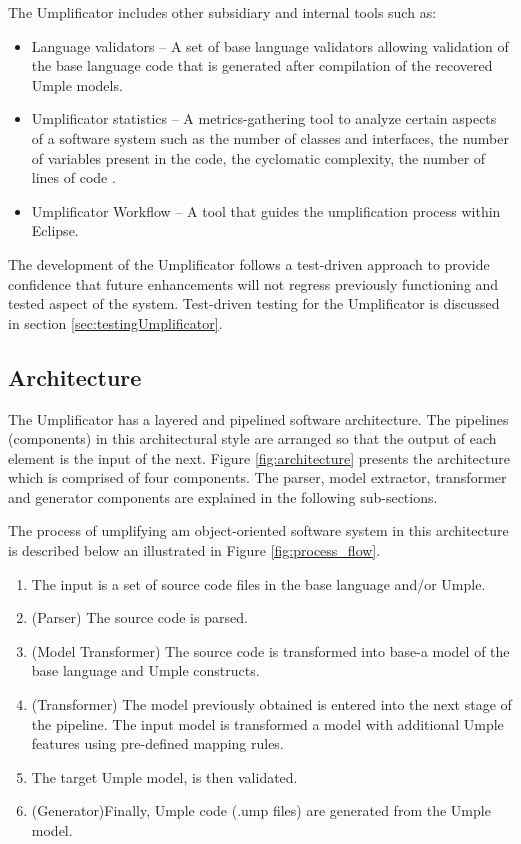 The Umplificator includes other subsidiary and internal tools such as:
\begin{itemize}
\item Language validators – A set of base language validators allowing validation of the base language code that is generated after compilation of the recovered Umple models.
\item Umplificator statistics –  A metrics-gathering tool to analyze certain aspects of a software system such as the number of classes and interfaces, the  number of variables present in the code, the cyclomatic complexity, the number of lines of code \cite{MetricsBuse}.  
\item Umplificator Workflow – A tool that guides the umplification process within Eclipse.
\end{itemize}

The development of the Umplificator follows a test-driven approach to provide confidence that future enhancements will not regress previously functioning and tested aspect of the system. Test-driven testing for the Umplificator is discussed in section \ref{sec:testingUmplificator}. 

\subsection{Architecture}
\label{sec:architecture}

The Umplificator has a layered and pipelined software architecture. The pipelines (components) in this architectural style are arranged so that the output of each element is the input of the next.  Figure \ref{fig:architecture} presents the architecture which is comprised  of four components. The parser, model extractor, transformer and generator components are explained in the following sub-sections.

The process of umplifying am object-oriented software system in this architecture is described below an illustrated in Figure \ref{fig:process_flow}.

\begin{enumerate}
\item  The input is a set of source code files in the base language and/or Umple.
\item (Parser) The source code is parsed. 
\item (Model Transformer) The source code is transformed into base-a model of the base language and Umple constructs.
\item (Transformer) The model previously obtained is entered into the next stage of the pipeline. The input model is transformed a model with additional Umple features using pre-defined mapping rules. 
\item The target Umple model, is then validated. 
\item (Generator)Finally, Umple code (.ump files) are generated from the Umple model.
\end{enumerate}


